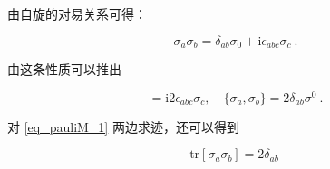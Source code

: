 由自旋的对易关系可得：
\begin{theorem}{}
\begin{equation}\label{eq_pauliM_1}
\sigma_a\sigma_b = \delta_{ab}\sigma_0 + \mathrm{i}\epsilon_{abc}\sigma_c~.
\end{equation}
\end{theorem}


由这条性质可以推出
\begin{lemma}{}
\begin{equation}
[\sigma_a,\sigma_b] = \mathrm{i}2\epsilon_{abc}\sigma_c,\quad \{\sigma_a,\sigma_b\}=2\delta_{ab}\sigma^0~.
\end{equation}
\end{lemma}
对 \autoref{eq_pauliM_1} 两边求迹，还可以得到
\begin{lemma}{}
\begin{equation}
\mathrm{tr}[\sigma_a \sigma_b]= 2\delta_{ab} ~
\end{equation}
\end{lemma}
